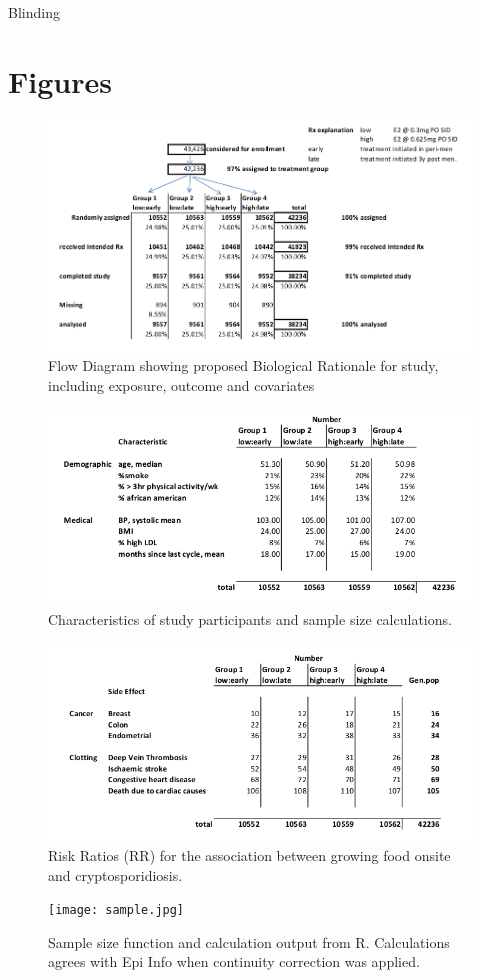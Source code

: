 \documentclass[12pt]{article}
\begin{document}
		Blinding 
		
	\section{Figures}

\begin{figure}[h!]
	\centering
	\includegraphics[scale=0.3]{figure1.jpg}
	\caption{Flow Diagram showing proposed Biological Rationale for study, including exposure, outcome and covariates }
	\label{figure1}
\end{figure}

\begin{figure}[h!]
	\centering
	\includegraphics[scale=0.5]{table1.jpg}
	\caption{Characteristics of study participants and sample size calculations.}
	\label{table1}
\end{figure}
 
\begin{figure}[h!]
	\centering
	\includegraphics[scale=0.5]{table2.jpg}
	\caption{Risk Ratios (RR) for the association between growing food onsite and cryptosporidiosis.}
	\label{table2}
\end{figure}

\begin{figure}[h!]
	\centering
	\texttt{[image: sample.jpg]}
	\caption{Sample size function and calculation output from R. Calculations agrees with Epi Info when continuity correction was applied.}
	\label{sample}
\end{figure}

\clearpage


\end{document}

